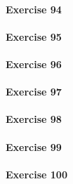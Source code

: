 \paragraph{Exercise 94}
\paragraph{Exercise 95}
\paragraph{Exercise 96}
\paragraph{Exercise 97}
\paragraph{Exercise 98}
\paragraph{Exercise 99}
\paragraph{Exercise 100}